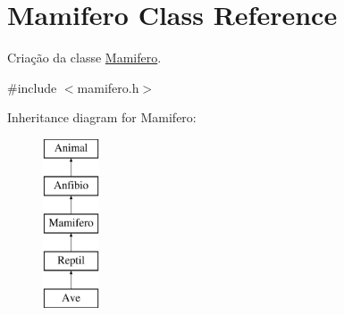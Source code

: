 \hypertarget{class_mamifero}{}\section{Mamifero Class Reference}
\label{class_mamifero}


Criação da classe \mbox{\hyperlink{class_mamifero}{Mamifero}}.  




{\ttfamily \#include $<$mamifero.\+h$>$}

Inheritance diagram for Mamifero\+:\begin{figure}[H]
\begin{center}
\leavevmode
\includegraphics[height=5.000000cm]{class_mamifero}
\end{center}
\end{figure}
